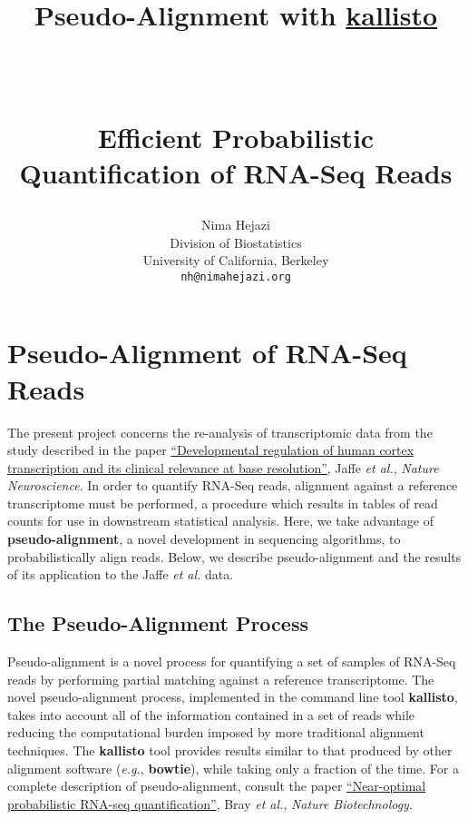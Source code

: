 \documentclass[paper=a4, fontsize=11pt]{scrartcl} %
\title{ \vspace{-1in} \usefont{OT1}{bch}{b}{n}
\huge \strut Pseudo-Alignment with
{\href{https://pachterlab.github.io/kallisto/about}{kallisto}} \strut \\
\Large \bfseries \strut Efficient Probabilistic Quantification of RNA-Seq Reads
  \strut
}
\author{ \usefont{OT1}{bch}{m}{n}
        Nima Hejazi\\ \usefont{OT1}{bch}{m}{n}
        Division of Biostatistics\\
        University of California, Berkeley\\ \usefont{OT1}{bch}{m}{n}
        \texttt{nh@nimahejazi.org}
}
\date{}
\begin{document}
\maketitle
\section{Pseudo-Alignment of RNA-Seq Reads}
The present project concerns the re-analysis of transcriptomic data from the
study described in the paper
{\href{http://www.nature.com/neuro/journal/v18/n1/abs/nn.3898.html}{``Developmental
regulation of human cortex transcription and its clinical relevance at base
resolution''}}, Jaffe \textit{et al.}, \textit{Nature Neuroscience}. In order to
quantify RNA-Seq reads, alignment against a reference transcriptome must be
performed, a procedure which results in tables of read counts for use in
downstream statistical analysis. Here, we take advantage of
\textbf{pseudo-alignment}, a novel development in sequencing algorithms, to
probabilistically align reads. Below, we describe pseudo-alignment and the
results of its application to the Jaffe \textit{et al.} data.

\subsection{The Pseudo-Alignment Process}
Pseudo-alignment is a novel process for quantifying a set of samples of RNA-Seq
reads by performing partial matching against a reference transcriptome. The
novel pseudo-alignment process, implemented in the command line tool
\textbf{kallisto}, takes into account all of the information contained in a set
of reads while reducing the computational burden imposed by more traditional
alignment techniques. The \textbf{kallisto} tool provides results similar to
that produced by other alignment software (\textit{e.g.}, \textbf{bowtie}),
while taking only a fraction of the time. For a complete description of
pseudo-alignment, consult the paper
{\href{http://www.nature.com/nbt/journal/v34/n5/full/nbt.3519.html}{``Near-optimal
probabilistic RNA-seq quantification''}}, Bray \textit{et al.}, \textit{Nature
Biotechnology}.
\end{document}
